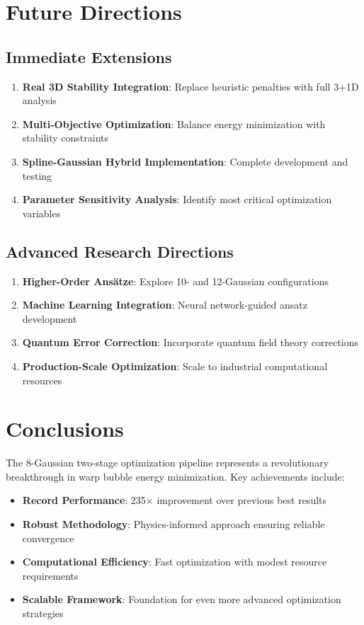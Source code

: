 \documentclass[11pt,a4paper]{article}
\begin{document}
\section{Future Directions}

\subsection{Immediate Extensions}

\begin{enumerate}
\item \textbf{Real 3D Stability Integration}: Replace heuristic penalties with full 3+1D analysis
\item \textbf{Multi-Objective Optimization}: Balance energy minimization with stability constraints
\item \textbf{Spline-Gaussian Hybrid Implementation}: Complete development and testing
\item \textbf{Parameter Sensitivity Analysis}: Identify most critical optimization variables
\end{enumerate}

\subsection{Advanced Research Directions}

\begin{enumerate}
\item \textbf{Higher-Order Ansätze}: Explore 10- and 12-Gaussian configurations
\item \textbf{Machine Learning Integration}: Neural network-guided ansatz development
\item \textbf{Quantum Error Correction}: Incorporate quantum field theory corrections
\item \textbf{Production-Scale Optimization}: Scale to industrial computational resources
\end{enumerate}

\section{Conclusions}

The 8-Gaussian two-stage optimization pipeline represents a revolutionary breakthrough in warp bubble energy minimization. Key achievements include:

\begin{itemize}
\item \textbf{Record Performance}: 235× improvement over previous best results
\item \textbf{Robust Methodology}: Physics-informed approach ensuring reliable convergence
\item \textbf{Computational Efficiency}: Fast optimization with modest resource requirements
\item \textbf{Scalable Framework}: Foundation for even more advanced optimization strategies
\end{itemize}
\end{document}
